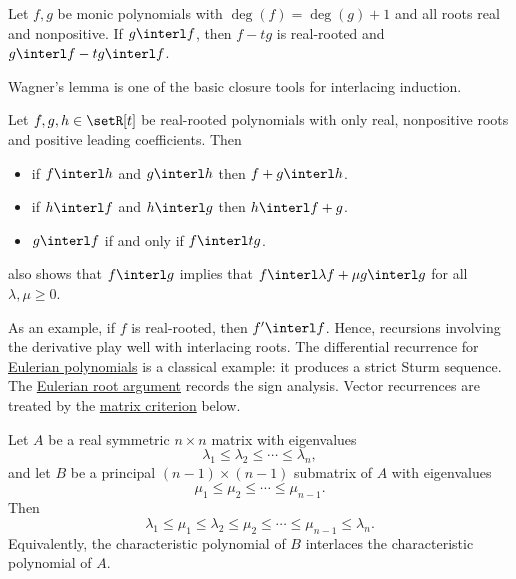 \begin{lemma}[Folklore]
Let $f, g$ be monic polynomials with $\deg(f) = \deg(g)+1$ and all roots
real and nonpositive.  If $g \interl f$, then $f-tg$ is real-rooted and
$g \interl f- tg \interl f$.
\end{lemma}


Wagner's lemma is one of the basic closure tools for interlacing induction.
\begin{lemma}
\label{wagnerLemma}
Let $f, g, h \in \setR[t]$ be real-rooted polynomials with
only real, nonpositive roots and positive leading coefficients.
Then
\begin{itemize}
\item if $f \interl h$ and $g \interl h$ then $f+g \interl h$.
\item if $h \interl f$ and $h \interl g$ then $h \interl f+g$.
\item $g \interl f$ if and only if $f \interl tg$.
\end{itemize}
\end{lemma}

 also shows that $f \interl g$ implies
that $f \interl \lambda f + \mu g \interl g$ for all $\lambda, \mu \geq 0$.


As an example, if $f$ is real-rooted, then $f' \interl f$.
Hence, recursions involving the derivative play well with interlacing roots.
The differential recurrence for
\hyperref[eulerianZeros]{Eulerian polynomials} is a classical example: it
produces a strict Sturm sequence.  The
\hyperref[ex:eulerianSturm]{Eulerian root argument} records the sign analysis.
Vector recurrences are treated by the
\hyperref[matrixPreservesInterlacingSequences]{matrix criterion} below.


\begin{theorem}
\label{cauchyInterlacingTheorem}
Let $A$ be a real symmetric $n \times n$ matrix with eigenvalues
\[
 \lambda_1 \leq \lambda_2 \leq \dotsb \leq \lambda_n,
\]
and let $B$ be a principal $(n-1)\times(n-1)$ submatrix of $A$ with eigenvalues
\[
 \mu_1 \leq \mu_2 \leq \dotsb \leq \mu_{n-1}.
\]
Then
\[
 \lambda_1 \leq \mu_1 \leq \lambda_2 \leq \mu_2 \leq \dotsb
 \leq \mu_{n-1} \leq \lambda_n.
\]
Equivalently, the characteristic polynomial of $B$ interlaces the
characteristic polynomial of $A$.
\end{theorem}



